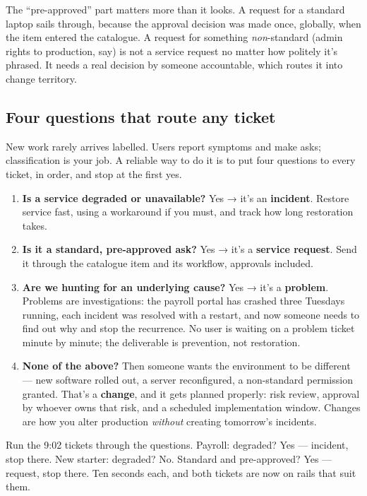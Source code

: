 The ``pre-approved'' part matters more than it looks. A request for a standard laptop sails through, because the approval decision was made once, globally, when the item entered the catalogue. A request for something \emph{non}-standard (admin rights to production, say) is not a service request no matter how politely it's phrased. It needs a real decision by someone accountable, which routes it into change territory.



\subsection{Four questions that route any ticket}


New work rarely arrives labelled. Users report symptoms and make asks; classification is your job. A reliable way to do it is to put four questions to every ticket, in order, and stop at the first yes.


\begin{enumerate}[leftmargin=*]
\item \textbf{Is a service degraded or unavailable?} Yes → it's an \textbf{incident}. Restore service fast, using a workaround if you must, and track how long restoration takes.
\item \textbf{Is it a standard, pre-approved ask?} Yes → it's a \textbf{service request}. Send it through the catalogue item and its workflow, approvals included.
\item \textbf{Are we hunting for an underlying cause?} Yes → it's a \textbf{problem}. Problems are investigations: the payroll portal has crashed three Tuesdays running, each incident was resolved with a restart, and now someone needs to find out why and stop the recurrence. No user is waiting on a problem ticket minute by minute; the deliverable is prevention, not restoration.
\item \textbf{None of the above?} Then someone wants the environment to be different — new software rolled out, a server reconfigured, a non-standard permission granted. That's a \textbf{change}, and it gets planned properly: risk review, approval by whoever owns that risk, and a scheduled implementation window. Changes are how you alter production \emph{without} creating tomorrow's incidents.
\end{enumerate}

Run the 9:02 tickets through the questions. Payroll: degraded? Yes — incident, stop there. New starter: degraded? No. Standard and pre-approved? Yes — request, stop there. Ten seconds each, and both tickets are now on rails that suit them.



